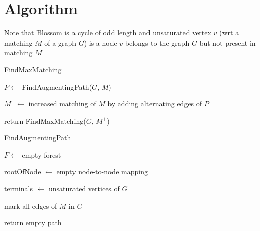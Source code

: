 
% 
\section{Algorithm}
Note that Blossom is a cycle of odd length and unsaturated vertex $v$ (wrt a matching $M$ of a graph $G$) is a node $v$ belongs to the graph $G$ but not present in matching $M$

\begin{algorithm}[!h]
\SetAlgoLined
{}
\caption{FindMaxMatching}

$P \leftarrow$ FindAugmentingPath($G$, $M$)


$M^+ \leftarrow$ increased matching of $M$ by adding alternating edges of $P$

return FindMaxMatching($G$, $M^+$)

\end{algorithm}


\begin{algorithm}[!h]
\caption{FindAugmentingPath}

$F \leftarrow$ empty forest

rootOfNode $\leftarrow$ empty node-to-node mapping

terminals $\leftarrow$ unsaturated vertices of $G$

    
mark all edges of $M$ in $G$


return empty path
\end{algorithm}

